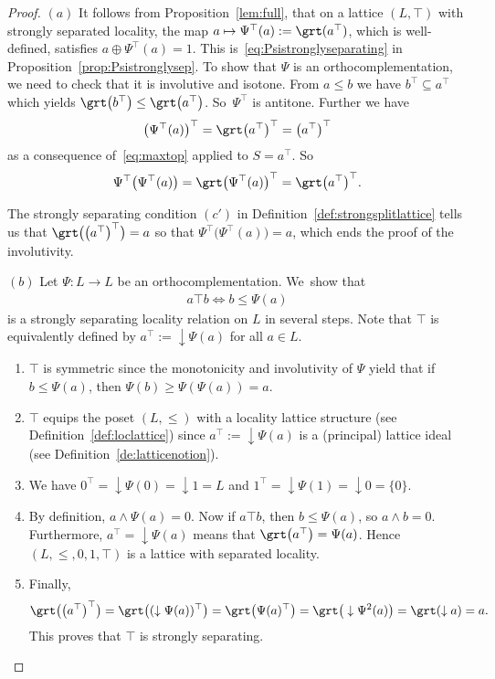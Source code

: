 \documentclass[pdftex]{sigma}
\numberwithin{equation}{section}
\newcommand{\loc}{locality\xspace}
\newcommand{\pone}{separating\xspace }
\def \ptwob {separated\xspace }
\begin{document}
\begin{proof}
$(a)$
It follows from Proposition~\ref{lem:full}, that on a lattice $(L, \top)$ with strongly \ptwob \loc, the map $a\mapsto \Psi^\top(a):=\grt (a^\top)$, which is well-defined, satisfies $a\oplus \Psi^\top(a)= 1$. This is~\eqref{eq:Psistronglyseparating} in Proposition~\ref{prop:Psistronglysep}. To show that $\Psi$ is an orthocomplementation, we need to check that it is involutive and isotone. From $a\leq b$ we have $b^\top\subseteq a^\top$ which yields $\grt \big(b^\top\big)\leq\grt \big(a^\top\big)$. So~$\Psi^\top$ is antitone. Further we have
\begin{gather*}
\big(\Psi^\top(a)\big)^\top=\grt\big(a^\top\big)^\top=\big(a^\top\big)^\top
\end{gather*}
as a consequence of~\eqref{eq:maxtop} applied to $S=a^\top$. So
\begin{gather*}
\Psi^\top\big(\Psi^\top(a)\big)=\grt\big(\Psi^\top(a)\big)^\top=\grt \big(a^\top\big)^\top.
\end{gather*}

The strongly separating condition $(c')$ in Definition~\ref{def:strongsplitlattice} tells us that
$\grt\big(\big(a^\top\big)^\top\big)= a$ so that
$\Psi^\top\big(\Psi^\top(a)\big)=a$, which ends the proof of the involutivity.


$(b)$ %
Let $\Psi\colon L\to L$ be an orthocomplementation. We~show that
\begin{gather*}
a\top b\Longleftrightarrow b\leq \Psi(a)
\end{gather*}
is a strongly \pone \loc relation on $L$ in several steps. Note that $\top$ is equivalently defined by $a^\top:=\downarrow\Psi(a)$ for all $a\in L$.
\begin{enumerate}\itemsep=0pt
	\item[(1)] $\top$ is symmetric since the monotonicity and involutivity of $\Psi$ yield that if $b\leq \Psi(a)$, then $ \Psi(b)\geq \Psi(\Psi(a))=a$.
	\item[(2)] $\top$ equips the poset $(L, \leq)$ with a \loc lattice structure (see Definition~\ref{def:loclattice}) since $a^\top:=\downarrow\Psi(a)$ is a (principal) lattice ideal (see Definition~\ref{de:latticenotion}).
	\item[(3)] We have $0^\top=\downarrow \Psi(0)=\downarrow 1=L$ and $1^\top =\downarrow \Psi(1)=\downarrow 0=\{0\}$.
	\item[(4)] By definition, $a\wedge \Psi (a)=0$. Now if $a\top b$, then $b\le \Psi (a)$, so $a \wedge b=0$. Furthermore, $a^\top = \downarrow \Psi(a)$ means that $\grt\big(a^\top\big)=\Psi(a)$. Hence $(L,\leq, 0, 1,\top)$ is a lattice with separated \loc.
	\item[(5)] Finally,
\begin{gather*}
\grt\big(\big(a^\top\big)^\top\big) = \grt\big( (\downarrow \Psi(a))^\top\big) =\grt\big( \Psi(a)^\top\big) =\grt \big( \downarrow \Psi^2(a)\big) = \grt (\downarrow a)=a.
\end{gather*}
This proves that $\top$ is strongly separating.
\end{enumerate}



\end{proof}
\end{document}
